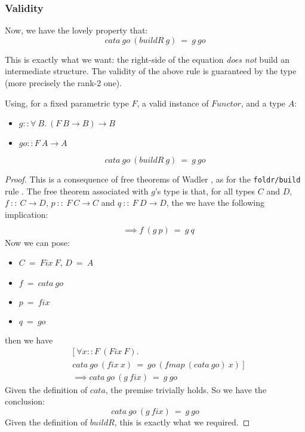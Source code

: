 \subsubsection{Validity}
Now, we have the lovely property that:
$$cata\ go\ (buildR\ g)\ =\ g\ go$$

This is exactly what we want: the right-side of the equation \emph{does not} build an intermediate structure. The validity of the above rule is guaranteed by the type (more precisely the rank-2 one).

\begin{theorem}
Using, for a fixed parametric type $F$, a valid instance of $Functor$, and a type $A$:
\begin{itemize}
	\item $g :: \forall\ B.\ (F\ B \to B) \to B$
	\item $go :: F\ A \to A $
\end{itemize}
$$cata\ go\ (buildR\ g)\ =\ g\ go$$
\end{theorem}
\begin{proof}
This is a consequence of free theorems of Wadler \cite{Wadler:1989:TF:99370.99404}, as for the \verb|foldr/build| rule \cite{Gill:1993:SCD:165180.165214}. The free theorem associated with $g$'s type is that, for all types $C$ and $D$, $f\ ::\ C \to D$, $p\ ::\ F\ C \to C$ and $q\ ::\ F\ D \to D$, the we have the following implication:
\begin{align*}
[\ \forall& x::C.\ f\ (p\ x)\ =\ q\ (fmap\ f\ x)\ ]\\
&\implies f\ (g\ p)\ =\ g\ q
\end{align*}
Now we can pose:
\begin{itemize}
	\item $C\ =\ Fix\ F$, $D\ =\ A$
	\item $f\ =\ cata\ go$
	\item $p\ =\ fix$
	\item $q\ =\ go$
\end{itemize}
then we have
\begin{align*}
&[\ \forall x::F\ (Fix\ F).\\
&cata\ go\ (fix\ x)\ =\ go\ (fmap\ (cata\ go)\ x)\ ]\\
&\implies cata\ go\ (g\ fix)\ =\ g\ go
\end{align*}
Given the definition of $cata$, the premise trivially holds. So we have the conclusion:
$$cata\ go\ (g\ fix)\ =\ g\ go$$
Given the definition of $buildR$, this is exactly what we required.
\end{proof}

